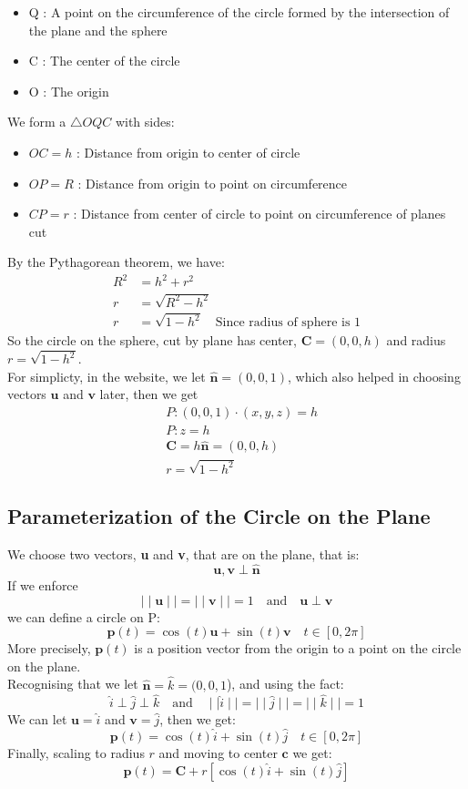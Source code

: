 \documentclass[11pt]{article}
\begin{document}
\vspace{0pt}
\begin{itemize}
    \item Q : A point on the circumference of the circle formed by the intersection of the plane and the sphere
    \item C : The center of the circle
    \item O : The origin
\end{itemize}
We form a $\triangle OQC$ with sides:
\begin{itemize}
    \item $OC = h$ : Distance from origin to center of circle
    \item $OP = R$ : Distance from origin to point on circumference
    \item $CP = r$ : Distance from center of circle to point on circumference of planes cut
\end{itemize}
By the Pythagorean theorem, we have:
\begin{align*}
    R^2 & = h^2 + r^2                                               \\
    r   & = \sqrt{R^2 - h^2}                                        \\
    r   & = \sqrt{1 - h^2} \quad \text{Since radius of sphere is 1}
\end{align*}
So the circle on the sphere, cut by plane has center, $\mathbf{C} = (0,0,h)$ and radius $r = \sqrt{1 - h^2}$. \\
For simplicty, in the website, we let $\hat{\textbf{n}} = (0,0,1)$, which also helped in choosing vectors $\mathbf{u}$ and $\mathbf{v}$ later, then we get
\begin{align*}
     & P : (0,0,1) \cdot (x,y,z) = h             \\
     & P : z = h                                 \\[1ex]
     & \mathbf{C} = h \hat{\textbf{n}} = (0,0,h) \\
     & r = \sqrt{1 - h^2}
\end{align*}
\subsection*{Parameterization of the Circle on the Plane}
We choose two vectors, \textbf{u} and \textbf{v}, that are on the plane, that is:
$$\mathbf{u}, \textbf{v} \perp \hat{\textbf{n}}$$
If we enforce $$\mid \mid \mathbf{u} \mid \mid = \mid \mid \textbf{v} \mid \mid = 1 \quad \text{and} \quad \mathbf{u} \perp \textbf{v}$$
we can define a circle on P:
$$\textbf{p}(t) = \cos(t) \mathbf{u} + \sin(t) \textbf{v} \quad t \in [0, 2\pi]$$
More precisely, $\textbf{p}(t)$ is a position vector from the origin to a point on the circle on the plane. \\
Recognising that we let $\hat{\textbf{n}} = \hat{k} = (0,0,1$), and using the fact:
$$\hat{i} \perp \hat{j} \perp \hat{k} \quad \text{and} \quad \mid \mid \hat{i} \mid \mid = \mid \mid \hat{j} \mid \mid = \mid \mid \hat{k} \mid \mid = 1$$
We can let $\textbf{u} = \hat{i}$ and $\textbf{v} = \hat{j}$, then we get:
$$\textbf{p}(t) = \cos(t) \hat{i} + \sin(t) \hat{j}\quad t \in [0, 2\pi]$$
Finally, scaling to radius $r$ and moving to center $\mathbf{c}$ we get:
$$\textbf{p}(t) = \mathbf{C} + r \left[\cos(t) \hat{i} + \sin(t) \hat{j}\right]$$
\end{document}
